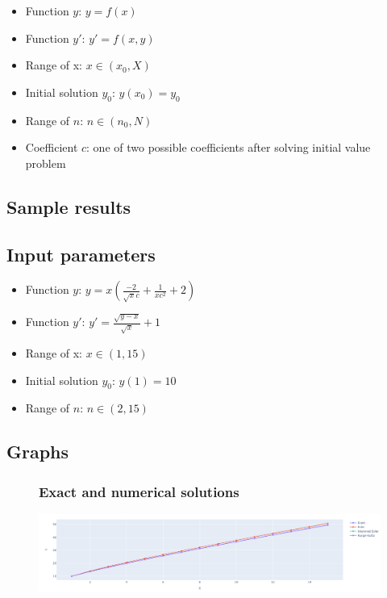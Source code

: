 \documentclass[12pt,letterpaper]{article}
\begin{document}
\begin{itemize}
    \item
         Function $y$: $y = f(x)$
    \item
         Function $y'$: $y' = f(x,y)$
    \item
         Range of x: $x \in (x_0, X)$
    \item
         Initial solution $y_0$: $y(x_0) = y_0$
    \item
         Range of $n$: $n \in (n_0, N)$
    \item
         Coefficient $c$: one of two possible coefficients after solving initial value problem
\end{itemize}

\begin{center}
    \section*{Sample results}
    \subsection*{Input parameters}
\end{center}

\begin{itemize}
    \item
         Function $y$: $y = x(\frac{-2}{\sqrt{x}c} + \frac{1}{xc^2} + 2)$
    \item
         Function $y'$: $y' = \frac{\sqrt{y - x}}{\sqrt{x}} + 1$
    \item
         Range of x: $x \in (1, 15)$
    \item
         Initial solution $y_0$: $y(1) = 10$
    \item
         Range of $n$: $n \in (2, 15)$
\end{itemize}

\begin{center}
    \subsection*{Graphs}
\end{center}

    \begin{figure}[!h]
    \begin{center}
            \subsubsection*{Exact and numerical solutions}
        \end{center}
        \centering
            \includegraphics[width=1\linewidth]{solutions.png}
    \end{figure}
\end{document}
